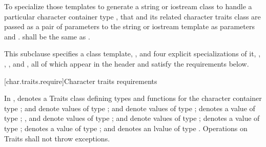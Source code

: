 \pnum
To specialize those templates to generate a string or
iostream class to handle a particular character container type
,
that and its related character traits class
are passed as a pair of parameters to the string or iostream template as
parameters
and
.
shall be the same as
.

\pnum
This subclause specifies a class template,
,
and four explicit specializations of it,
,
,
,
and
,
all of which appear in the header
and satisfy the requirements below.

[char.traits.require]{Character traits requirements}

\pnum
In ,
denotes a Traits class defining types and functions for the
character container type
;
and
denote values of type
;
and
denote values of type
;
denotes a value of type
;
,
and
denote values of type
;
and
denote values of type
;
denotes a value of type
;
denotes a value of type
;
and
denotes an lvalue of type
.
Operations on Traits shall not throw exceptions.

